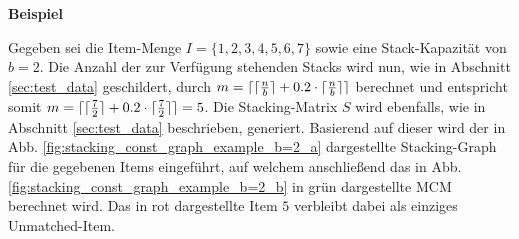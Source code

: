 \textbf{Beispiel}

Gegeben sei die Item-Menge $I = \{1, 2, 3, 4, 5, 6, 7\}$ sowie eine Stack-Kapazität von $b = 2$.
Die Anzahl der zur Verfügung stehenden Stacks wird nun, wie in Abschnitt \ref{sec:test_data} geschildert,
durch $m = \lceil\lceil\frac{n}{b}\rceil + 0.2 \cdot \lceil\frac{n}{b}\rceil\rceil$ berechnet und entspricht somit
$m = \lceil\lceil\frac{7}{2}\rceil + 0.2 \cdot \lceil\frac{7}{2}\rceil\rceil = 5$.
Die Stacking-Matrix $S$ wird ebenfalls, wie in Abschnitt \ref{sec:test_data} beschrieben, generiert.
Basierend auf dieser wird der in Abb. \ref{fig:stacking_const_graph_example_b=2_a} dargestellte Stacking-Graph
für die gegebenen Items eingeführt, auf welchem anschließend das in Abb. \ref{fig:stacking_const_graph_example_b=2_b} in grün dargestellte \textsc{MCM} berechnet wird. Das in rot dargestellte Item $5$ verbleibt dabei als einziges Unmatched-Item.

